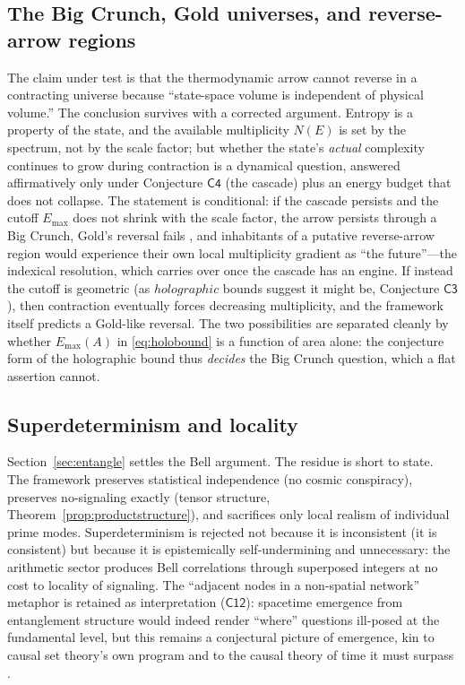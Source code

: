 \documentclass[11pt,a4paper]{article}
\theoremstyle{plain}
\theoremstyle{definition}
\theoremstyle{remark}
\begin{document}
\subsection{The Big Crunch, Gold universes, and reverse-arrow regions}

The claim under test is that the thermodynamic arrow cannot reverse in a contracting universe
because ``state-space volume is independent of physical volume.'' The conclusion survives
with a corrected argument. Entropy is a property of the state, and
the available multiplicity $N(E)$ is set by the spectrum, not by the scale factor; but
whether the state's \emph{actual} complexity continues to grow during contraction is a
dynamical question, answered affirmatively only under Conjecture $\mathsf{C4}$ (the
cascade) plus an energy budget that does not collapse. The statement is conditional:
if the cascade persists and the cutoff $E_{\max}$ does not shrink with the scale factor,
the arrow persists through a Big Crunch, Gold's reversal fails \cite{carroll2010}, and
inhabitants of a putative reverse-arrow region would experience their own local
multiplicity gradient as ``the future''---the indexical resolution, which
carries over once the cascade has an engine. If instead the cutoff is geometric (as
$holographic$ bounds suggest it might be, Conjecture $\mathsf{C3}$), then contraction
eventually forces decreasing multiplicity, and the framework itself predicts a Gold-like
reversal. The two possibilities are separated cleanly by whether $E_{\max}(A)$ in
\eqref{eq:holobound} is a function of area alone: the conjecture form of the holographic
bound thus \emph{decides} the Big Crunch question, which a flat
assertion cannot.

\subsection{Superdeterminism and locality}

Section~\ref{sec:entangle} settles the Bell argument. The residue is short
to state. The framework preserves statistical independence (no cosmic conspiracy), preserves
no-signaling exactly (tensor structure, Theorem~\ref{prop:productstructure}), and
sacrifices only local realism of individual prime modes. Superdeterminism is rejected not
because it is inconsistent (it is consistent) but because it is epistemically
self-undermining and unnecessary: the arithmetic sector produces Bell correlations through
superposed integers at no cost to locality of signaling. The ``adjacent nodes in a
non-spatial network'' metaphor is retained as interpretation ($\mathsf{C12}$): spacetime
emergence from entanglement structure would indeed render ``where'' questions ill-posed at
the fundamental level, but this remains a conjectural picture of emergence, kin to causal
set theory's own program \cite{sorkin2003} and to the causal theory of time it must
surpass \cite{malament1977}.
\end{document}
